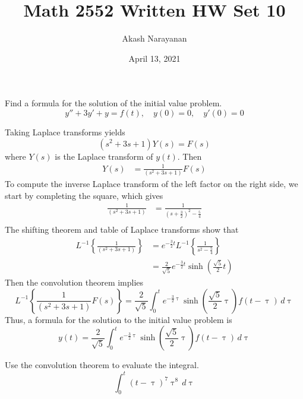 \documentclass[11pt, titlepage]{article}
\title{Math 2552 Written HW Set 10}
\author{Akash Narayanan}
\date{April 13, 2021}
\begin{document}
    \maketitle

    \begin{problem}[Trench 8.6.3a]
        Find a formula for the solution of the initial value problem.
        \[
            y'' + 3y' + y = f(t), \quad y(0) = 0, \quad y'(0) = 0
        \] 
    \end{problem}

    \begin{solution}
        Taking Laplace transforms yields
        \[
            (s^2 + 3s + 1) Y(s) = F(s)
        \] 
        where $Y(s)$ is the Laplace transform of $y(t)$. Then
        \begin{align*}
            Y(s) &= \frac{1}{(s^2 + 3s + 1)} F(s)
        \end{align*}
        To compute the inverse Laplace transform of the left factor on the right
        side, we start by completing the square, which gives
        \begin{align*}
            \frac{1}{(s^2 + 3s + 1)} &= \frac{1}{(s + \frac{3}{2})^2 - \frac{5}{4}} \\
        \end{align*}
        The shifting theorem and table of Laplace transforms show that
        \begin{align*}
            L^{-1} \left\{ \frac{1}{(s^2 + 3s + 1)} \right\} &= e^{-\frac{3}{2}t} L^{-1}
                \left\{ \frac{1}{s^2 - \frac{5}{4}} \right\} \\
            &= \frac{2}{\sqrt{5}} e^{-\frac{3}{2}t} \sinh \left(\frac{\sqrt{5}}{2}t \right)
        \end{align*}
        Then the convolution theorem implies
        \[
            L^{-1} \left\{ \frac{1}{(s^2 + 3s + 1)} F(s) \right\} = \frac{2}{\sqrt{5}}
                \int_{0}^{t} e^{-\frac{3}{2}\uptau} \sinh \left( \frac{\sqrt{5}}{2} \uptau \right) f(t
                - \uptau) \, d\uptau
        \] 
        Thus, a formula for the solution to the initial value problem is
        \[
            y(t) = \frac{2}{\sqrt{5}}
                \int_{0}^{t} e^{-\frac{3}{2}\uptau}\sinh \left( \frac{\sqrt{5}}{2} \uptau \right) f(t
                - \uptau) \, d\uptau
        \] 
    \end{solution}

    \pagebreak

    \begin{problem}[Trench 8.6.5a]
        Use the convolution theorem to evaluate the integral.
        \[
            \int_{0}^{t} (t - \uptau)^{7} \uptau^{8} \, d\uptau
        \] 
    \end{problem}
\end{document}
